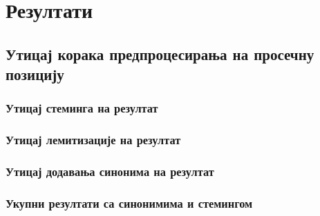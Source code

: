 \chapter{Резултати}



\section{Утицај корака предпроцесирања на просечну позицију}

\subsection{Утицај стеминга на резултат}
\subsection{Утицај лемитизације на резултат}
\subsection{Утицај додавања синонима на резултат}
\subsection{Укупни резултати са синонимима и стемингом}
